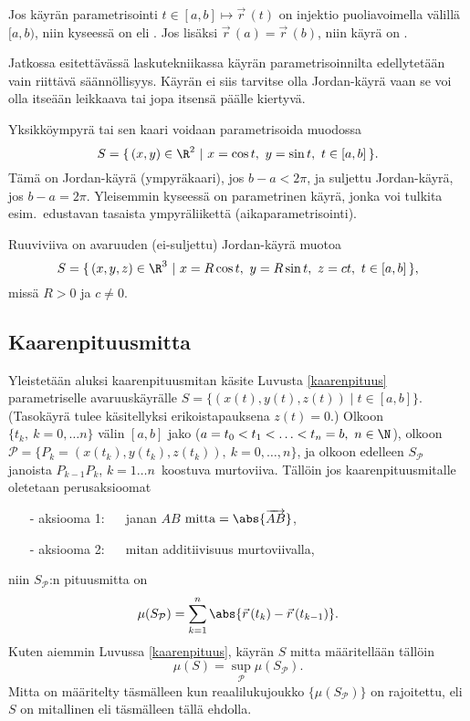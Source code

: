 Jos käyrän parametrisointi $t\in[a,b]\mapsto\vec r\,(t)$ on injektio puoliavoimella välillä
$[a,b)$, niin kyseessä on  eli . Jos lisäksi
$\vec r\,(a)=\vec r\,(b)$, niin käyrä on .
\begin{figure}[H]
\begin{center}

\end{center}
\end{figure}
Jatkossa esitettävässä laskutekniikassa käyrän parametrisoinnilta edellytetään vain riittävä
säännöllisyys. Käyrän ei siis tarvitse olla Jordan-käyrä vaan se voi olla itseään leikkaava tai
jopa itsensä päälle kiertyvä.
\begin{Exa}
Yksikköympyrä tai sen kaari voidaan parametrisoida muodossa
\[
S=\{\,(x,y)\in\R^2 \ | \ x=\cos t, \ y=\sin t, \ t\in [a,b]\,\}.
\]
Tämä on Jordan-käyrä (ympyräkaari), jos $b-a<2\pi$, ja suljettu Jordan-käyrä, jos $b-a=2\pi$.
Yleisemmin kyseessä on parametrinen käyrä, jonka voi tulkita esim.\ edustavan tasaista
ympyräliikettä (aikaparametrisointi). \loppu
\end{Exa}
\begin{Exa} Ruuviviiva on avaruuden (ei-suljettu) Jordan-käyrä muotoa
\[
S=\{\,(x,y,z)\in\R^3 \ | \ x=R\cos t, \ y=R\sin t, \ z=ct, \ t\in [a,b]\,\},
\]
missä $R>0$ ja $c \neq 0$. \loppu
\end{Exa}

\subsection*{Kaarenpituusmitta}

Yleistetään aluksi kaarenpituusmitan käsite Luvusta \ref{kaarenpituus} parametriselle 
avaruuskäyrälle $S = \{(x(t),y(t),z(t)) \mid t \in [a,b]\}$. (Tasokäyrä tulee käsitellyksi
erikoistapauksena $z(t)=0$.) Olkoon $\{t_k, \ k=0,\ldots n\}$ välin $[a,b]$ jako 
($a=t_0<t_1<\ldots<t_n=b,\ n\in\N$), olkoon 
$\mathcal{P}=\{P_k=(x(t_k),y(t_k),z(t_k)),\ k=0,\ldots,n\}$, ja olkoon edelleen 
$S_{\mathcal{P}}$ janoista $P_{k-1}P_k$, $k=1\ldots n\,$ koostuva murtoviiva. Tällöin jos
kaarenpituusmitalle oletetaan perusaksioomat
\begin{itemize}
\item[-] aksiooma 1: $\quad$ janan $AB$ $\text{mitta}=\abs{\overrightarrow{AB}}$,
\item[-] aksiooma 2: $\quad$ mitan additiivisuus murtoviivalla,
\end{itemize}
niin $S_{\mathcal{P}}$:n pituusmitta on
\[
\mu(S_{\mathcal{P}})=\sum_{k=1}^n\abs{\vec r\,(t_k)-\vec r\,(t_{k-1})}.
\]
Kuten aiemmin Luvussa \ref{kaarenpituus}, käyrän $S$ mitta määritellään tällöin
\[
\mu(S)=\sup_{\mathcal{P}} \mu(S_{\mathcal{P}}).
\]
Mitta on määritelty täsmälleen kun reaalilukujoukko $\{\mu(S_{\mathcal{P}})\}$ on rajoitettu,
%
eli $S$ on mitallinen eli  täsmälleen tällä ehdolla.

